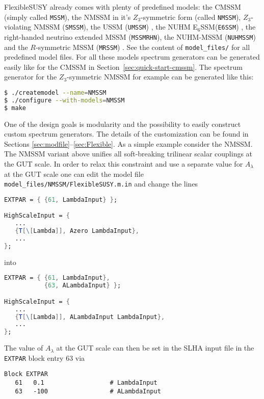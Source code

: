 \documentclass[final,3p,11pt,pdflatex]{elsarticle}
\makeatletter
\newcommand{\fs}{FlexibleSUSY\@\xspace}
\newcommand{\ESSM}{E$_6$SSM\@\xspace}
\newcommand{\code}[1]{\lstinline|#1|}  %
\newcommand{\secref}[1]{Section~\ref{#1}}
\makeatother
\begin{document}
\fs already comes with plenty of predefined models: the CMSSM (simply
called \code{MSSM}), the NMSSM \cite{NMSSM} in it's $Z_3$-symmetric form (called \code{NMSSM}), $Z_3$-violating NMSSM (\code{SMSSM}), the USSM (\code{UMSSM})
\cite{Fayet:1977yc,Suematsu:1994qm,Cvetic:1995rj,deCarlos:1997yv,Cvetic:1997ky,Demir:1998dk,Langacker:1998tc,Erler:2002pr,Choi:2006fz,Ham:2007wc,Langacker:2008yv,Ham:2008xf,Kalinowski:2008iq},
the NUHM \ESSM (\code{E6SSM}) \cite{Athron:2007en}, the
right-handed neutrino extended MSSM (\code{MSSMRHN}), the NUHM-MSSM
(\code{NUHMSSM}) and the $R$-symmetric MSSM (\code{MRSSM})
\cite{Kribs:2007ac}.  See the content of \code{model_files/} for all
predefined model files.  For all these models spectrum generators can
be generated easily like for the CMSSM in
\secref{sec:quick-start-cmssm}.  The spectrum generator for the
$Z_3$-symmetric NMSSM for example can be generated like this:
%
\begin{lstlisting}[language=bash]
$ ./createmodel --name=NMSSM
$ ./configure --with-models=NMSSM
$ make
\end{lstlisting}%
%
One of the design goals is modularity and the possibility to easily
construct custom spectrum generators.  The details of the
customization can be found in Sections
\ref{sec:modfile}--\ref{sec:Flexible}.  As a simple example consider
the NMSSM.  The NMSSM variant above unifies all soft-breaking
trilinear scalar couplings at the GUT scale.  In order to relax this
constraint and use a separate value for $A_\lambda$ at the GUT scale
one can edit the model file \code{model_files/NMSSM/FlexibleSUSY.m.in} and
change the lines
%
\begin{lstlisting}[language=Mathematica]
EXTPAR = { {61, LambdaInput} };

HighScaleInput = {
   ...
   {T[\[Lambda]], Azero LambdaInput},
   ...
};
\end{lstlisting}
%
into
%
\begin{lstlisting}[language=Mathematica]
EXTPAR = { {61, LambdaInput},
           {63, ALambdaInput} };

HighScaleInput = {
   ...
   {T[\[Lambda]], ALambdaInput LambdaInput},
   ...
};
\end{lstlisting}
%
The value of $A_\lambda$ at the GUT scale can then be set in the SLHA
input file in the \code{EXTPAR} block entry $63$ via
%
\begin{lstlisting}
Block EXTPAR
   61   0.1                  # LambdaInput
   63   -100                 # ALambdaInput
\end{lstlisting}
\end{document}
